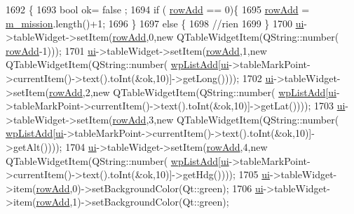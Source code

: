 \begin{DoxyCode}
1692 \{
1693     \textcolor{keywordtype}{bool} ok= false ;
1694     \textcolor{keywordflow}{if} ( \hyperlink{a00008_acd21fbe1057e371b610edb45a792322b}{rowAdd} == 0)\{
1695         \hyperlink{a00008_acd21fbe1057e371b610edb45a792322b}{rowAdd} = \hyperlink{a00008_abe44ff3e7525f2a803ac3cbce2fe7ba6}{m\_mission}.length()+1;
1696     \}
1697     \textcolor{keywordflow}{else} \{
1698         \textcolor{comment}{//rien}
1699     \}
1700     \hyperlink{a00008_a6dc041ef6a2ffb329928d2913e8344e6}{ui}->tableWidget->setItem(\hyperlink{a00008_acd21fbe1057e371b610edb45a792322b}{rowAdd},0,\textcolor{keyword}{new} QTableWidgetItem(QString::number(
      \hyperlink{a00008_acd21fbe1057e371b610edb45a792322b}{rowAdd}-1)));
1701     \hyperlink{a00008_a6dc041ef6a2ffb329928d2913e8344e6}{ui}->tableWidget->setItem(\hyperlink{a00008_acd21fbe1057e371b610edb45a792322b}{rowAdd},1,\textcolor{keyword}{new} QTableWidgetItem(QString::number(
      \hyperlink{a00008_a98ca93f10581619f71df8f495b465cde}{wpListAdd}[\hyperlink{a00008_a6dc041ef6a2ffb329928d2913e8344e6}{ui}->tableMarkPoint->currentItem()->text().toInt(&ok,10)]->getLong())));
1702     \hyperlink{a00008_a6dc041ef6a2ffb329928d2913e8344e6}{ui}->tableWidget->setItem(\hyperlink{a00008_acd21fbe1057e371b610edb45a792322b}{rowAdd},2,\textcolor{keyword}{new} QTableWidgetItem(QString::number(
      \hyperlink{a00008_a98ca93f10581619f71df8f495b465cde}{wpListAdd}[\hyperlink{a00008_a6dc041ef6a2ffb329928d2913e8344e6}{ui}->tableMarkPoint->currentItem()->text().toInt(&ok,10)]->getLat())));
1703     \hyperlink{a00008_a6dc041ef6a2ffb329928d2913e8344e6}{ui}->tableWidget->setItem(\hyperlink{a00008_acd21fbe1057e371b610edb45a792322b}{rowAdd},3,\textcolor{keyword}{new} QTableWidgetItem(QString::number(
      \hyperlink{a00008_a98ca93f10581619f71df8f495b465cde}{wpListAdd}[\hyperlink{a00008_a6dc041ef6a2ffb329928d2913e8344e6}{ui}->tableMarkPoint->currentItem()->text().toInt(&ok,10)]->getAlt())));
1704     \hyperlink{a00008_a6dc041ef6a2ffb329928d2913e8344e6}{ui}->tableWidget->setItem(\hyperlink{a00008_acd21fbe1057e371b610edb45a792322b}{rowAdd},4,\textcolor{keyword}{new} QTableWidgetItem(QString::number(
      \hyperlink{a00008_a98ca93f10581619f71df8f495b465cde}{wpListAdd}[\hyperlink{a00008_a6dc041ef6a2ffb329928d2913e8344e6}{ui}->tableMarkPoint->currentItem()->text().toInt(&ok,10)]->getHdg())));
1705     \hyperlink{a00008_a6dc041ef6a2ffb329928d2913e8344e6}{ui}->tableWidget->item(\hyperlink{a00008_acd21fbe1057e371b610edb45a792322b}{rowAdd},0)->setBackgroundColor(Qt::green);
1706     \hyperlink{a00008_a6dc041ef6a2ffb329928d2913e8344e6}{ui}->tableWidget->item(\hyperlink{a00008_acd21fbe1057e371b610edb45a792322b}{rowAdd},1)->setBackgroundColor(Qt::green);

\end{DoxyCode}
